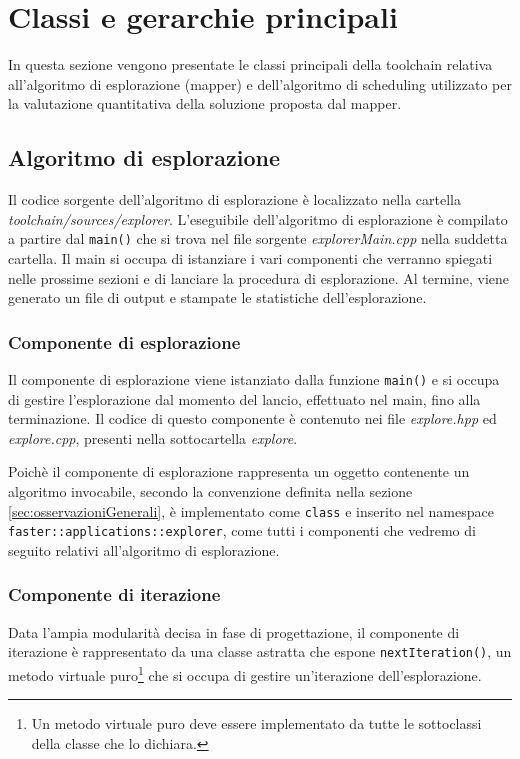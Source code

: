 \section{Classi e gerarchie principali}
\label{sec:classiGerarchie}
In questa sezione vengono presentate le classi principali della toolchain 
relativa all'algoritmo di esplorazione (mapper) e dell'algoritmo di scheduling
utilizzato per la valutazione quantitativa della soluzione proposta dal mapper.

\subsection{Algoritmo di esplorazione}
\label{subsec:algoritmoEsplorazione}
Il codice sorgente dell'algoritmo di esplorazione è localizzato nella cartella 
\emph{toolchain/sources/explorer}. L'eseguibile dell'algoritmo di esplorazione 
è compilato a partire dal \verb+main()+ che si trova nel file sorgente 
\emph{explorerMain.cpp} nella suddetta cartella. Il main si occupa di 
istanziare i vari componenti che verranno spiegati nelle prossime sezioni e di 
lanciare la procedura di esplorazione. Al termine, viene generato un file di 
output e stampate le statistiche dell'esplorazione.

\subsubsection{Componente di esplorazione}
Il componente di esplorazione viene istanziato dalla funzione \verb+main()+ e 
si occupa di gestire l'esplorazione dal momento del lancio, effettuato nel main, 
fino alla terminazione. Il codice di questo componente è contenuto nei file 
\emph{explore.hpp} ed \emph{explore.cpp}, presenti nella sottocartella 
\emph{explore}.


Poichè il componente di esplorazione rappresenta un oggetto contenente un 
algoritmo invocabile, secondo la convenzione definita nella sezione
\ref{sec:osservazioniGenerali}, è implementato come \verb+class+ e 
inserito nel namespace \verb+faster::applications::explorer+, come tutti i 
componenti che vedremo di seguito relativi all'algoritmo di esplorazione.


\subsubsection{Componente di iterazione}
Data l'ampia modularità decisa in fase di progettazione, il componente di 
iterazione è rappresentato da una classe astratta che espone 
\verb+nextIteration()+, un metodo virtuale puro\footnote{Un metodo virtuale 
puro deve essere implementato da tutte le sottoclassi della classe che lo 
dichiara.} che si occupa di gestire un'iterazione dell'esplorazione.

